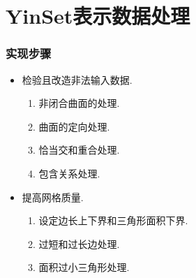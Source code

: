 \documentclass[UTF8]{ctexbeamer}	%
\theoremstyle{plain}
\theoremstyle{definition}
\theoremstyle{remark}
\numberwithin{equation}{section}
\begin{document}

\section{YinSet表示数据处理}
\begin{frame}
    \frametitle{实现步骤}
    \begin{itemize}
        \item 检验且改造非法输入数据.
    \begin{enumerate}
        \item 非闭合曲面的处理.
        \item 曲面的定向处理.
        \item 恰当交和重合处理.
        \item 包含关系处理.
    \end{enumerate}

        \item 提高网格质量.
        \begin{enumerate}
            \item 设定边长上下界和三角形面积下界.
            \item 过短和过长边处理.
            \item 面积过小三角形处理.
        \end{enumerate}
    \end{itemize}
\end{frame}
\end{document}
